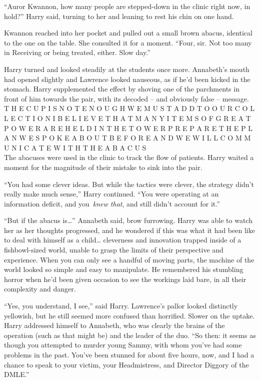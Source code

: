 ``Auror Kwannon, how many people are stepped-down in the clinic right
now, in hold?'' Harry said, turning to her and leaning to rest his chin
on one hand.

Kwannon reached into her pocket and pulled out a small brown abacus,
identical to the one on the table. She consulted it for a moment.
``Four, sir. Not too many in Receiving or being treated, either. Slow
day.''

Harry turned and looked steadily at the students once more. Annabeth's
mouth had opened slightly and Lawrence looked nauseous, as if he'd been
kicked in the stomach. Harry supplemented the effect by shoving one of
the parchments in front of him towards the pair, with its decoded -- and
obviously false -- message.\\

\noindent T H E C U P I S N O T E N O U G H W E M U S T A D D T O O U R
C O L L E C T I O N I B E L I E V E T H A T M A N Y I T E M S O F G R E
A T P O W E R A R E H E L D I N T H E T O W E R P R E P A R E T H E P L
A N W E S P O K E A B O U T B E F O R E A N D W E W I L L C O M M U N I
C A T E W I T H T H E A B A C U S\\

The abacuses were used in the clinic to track the flow of patients.
Harry waited a moment for the magnitude of their mistake to sink into
the pair.

``You had some clever ideas. But while the tactics were clever, the
strategy didn't really make much sense,'' Harry continued. ``You were
operating at an information deficit, and you~\emph{knew that}, and still
didn't account for it.''

``But if the abacus is\ldots{}'' Annabeth said, brow furrowing. Harry
was able to watch her as her thoughts progressed, and he wondered if
this was what it had been like to deal with himself as a child\ldots{}
cleverness and innovation trapped inside of a fishbowl-sized world,
unable to grasp the limits of their perspective and experience. When you
can only see a handful of moving parts, the machine of the world looked
so simple and easy to manipulate. He remembered his stumbling horror
when he'd been given occasion to see the workings laid bare, in all
their complexity and danger.

``Yes, you understand, I see,'' said Harry. Lawrence's pallor looked
distinctly yellowish, but he still seemed more confused than horrified.
Slower on the uptake. Harry addressed himself to Annabeth, who was
clearly the brains of the operation (such as that might be) and the
leader of the duo. ``So then: it seems as though you attempted to murder
young Sammy, with whom you've had some problems in the past. You've been
stunned for about five hours, now, and I had a chance to speak to your
victim, your Headmistress, and Director Diggory of the DMLE.''

